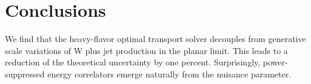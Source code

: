 \section{Conclusions}\label{sec:conclusions}

We find that the heavy-flavor optimal transport solver decouples from
generative scale variations of W plus jet production in the planar
limit. This leads to a reduction of the theoretical uncertainty by one
percent. Surprisingly, power-suppressed energy correlators emerge
naturally from the nuisance parameter.


